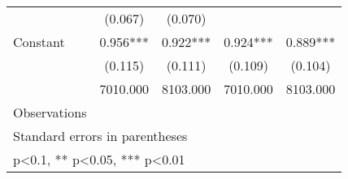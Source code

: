 \begin{table}[htbp]
\begin{tabular}{l*{4}{c}}
                &  (0.067)   &  (0.070)   &            &            \\
Constant        &    0.956***&    0.922***&    0.924***&    0.889***\\
                &  (0.115)   &  (0.111)   &  (0.109)   &  (0.104)   \\
\midrule
\hspace{2mm}    & 7010.000   & 8103.000   & 7010.000   & 8103.000   \\
Observations    &            &            &            &            \\
\bottomrule
\multicolumn{5}{l}{\footnotesize Standard errors in parentheses}\\
\multicolumn{5}{l}{\footnotesize * p<0.1, ** p<0.05, *** p<0.01}\\
\end{tabular}
\end{table}
